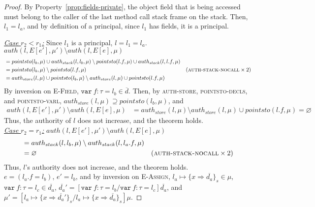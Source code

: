 \documentclass{llncs}
\newcommand{\keywadj}[1]{\mathtt{#1}}
\newcommand{\keyw}[1]{\keywadj{#1}~}
\begin{document}
\begin{proof}
By Property~\ref{prop:fields-private}, the object field that is being accessed must belong to the caller of the last method call stack frame on the stack. Then, $l_1 = l_a$, and by definition of a principal, since $l_1$ has fields, it is a principal.

\noindent\underline{\underline{\textit{Case $r_2 < r_1$:}}} Since $l_1$ is a principal, $l = l_1 = l_a$.\\
\noindent$auth(l, E[e'], \mu') \setminus auth(l, E[e], \mu)$
\vspace{-7pt}
\begin{align*}
&= pointsto(l_b, \mu) \cup auth_{stack}(l, l_b, \mu) \setminus pointsto(l.f, \mu) \cup auth_{stack}(l, l.f, \mu)\\
&= pointsto(l_b, \mu) \setminus pointsto(l.f, \mu) & (\textsc{auth-stack-nocall} \times 2)\\
&= auth_{store}(l, \mu) \cup pointsto(l_b, \mu) \setminus auth_{store}(l, \mu) \cup pointsto(l.f, \mu)
\end{align*}
By inversion on \textsc{E-Field}, $\keyw{var} f : \tau = l_b \in \overline{d}$. Then, by \textsc{auth-store}, \textsc{pointsto-decls}, and \textsc{pointsto-varl}, $auth_{store}(l, \mu) \supseteq pointsto(l_b, \mu)$, and
\begin{align*}
auth(l, E[e'], \mu') \setminus auth(l, E[e], \mu) &= auth_{store}(l, \mu) \setminus auth_{store}(l, \mu) \cup pointsto(l.f, \mu) = \varnothing
\end{align*}
Thus, the authority of $l$ does not increase, and the theorem holds.\\

\noindent\underline{\underline{\textit{Case $r_2 = r_1$:}}} $auth(l, E[e'], \mu') \setminus auth(l, E[e], \mu)$
\vspace{-7pt}
\begin{align*}
&= auth_{stack}(l, l_b, \mu) \setminus auth_{stack}(l, l_a.f, \mu)\\ 
&= \varnothing & (\textsc{auth-stack-nocall} \times 2)
\end{align*}
Thus, $l$'s authority does not increase, and the theorem holds.\\


\noindent{}
$e = (l_a.f = l_b)$, $e' = l_b$, and by inversion on \textsc{E-Assign}, $l_a \mapsto \{ x \Rightarrow \overline{d_a} \}_{s} \in \mu$, \mbox{$\keyw{var} f : \tau = l_c \in \overline{d_a}$}, $\overline{d_a}' = [\keyw{var} f : \tau = l_b/\keyw{var} f : \tau = l_c]\overline{d_a}$, and $\mu' = [l_a \mapsto \{ x \Rightarrow \overline{d_a}' \}_{s}/l_a \mapsto \{ x \Rightarrow \overline{d_a} \}_{s}]\mu$.


\end{proof}
\end{document}
